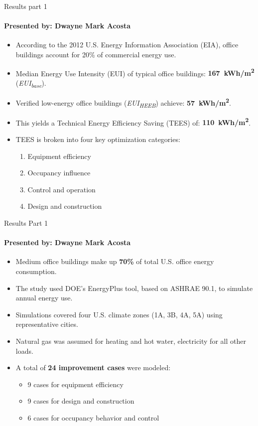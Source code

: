 \documentclass{beamer}
\begin{document}
\begin{frame}{Results part 1}
\framesubtitle{Presented by: Dwayne Mark Acosta}
\begin{itemize}
    \item According to the 2012 U.S. Energy Information Association (EIA), office buildings account for 20\% of commercial energy use.
    \item Median Energy Use Intensity (EUI) of typical office buildings: \textbf{167~kWh/m\textsuperscript{2}} (\textit{EUI\textsubscript{base}}).
    \item Verified low-energy office buildings (\textit{EUI\textsubscript{HEEB}}) achieve: \textbf{57~kWh/m\textsuperscript{2}}.
    \item This yields a Technical Energy Efficiency Saving (TEES) of: \textbf{110~kWh/m\textsuperscript{2}}.
    \item TEES is broken into four key optimization categories:
    \begin{enumerate}
        \item Equipment efficiency
        \item Occupancy influence
        \item Control and operation
        \item Design and construction
    \end{enumerate}
\end{itemize}
\end{frame}

\begin{frame}{Results Part 1}
\framesubtitle{Presented by: Dwayne Mark Acosta}

\begin{itemize}
    \item Medium office buildings make up \textbf{70\%} of total U.S. office energy consumption.
    \item The study used DOE's EnergyPlus tool, based on ASHRAE 90.1, to simulate annual energy use.
    \item Simulations covered four U.S. climate zones (1A, 3B, 4A, 5A) using representative cities.
    \item Natural gas was assumed for heating and hot water, electricity for all other loads.
    \item A total of \textbf{24 improvement cases} were modeled:
    \begin{itemize}
        \item 9 cases for equipment efficiency
        \item 9 cases for design and construction
        \item 6 cases for occupancy behavior and control
    \end{itemize}
\end{itemize}
\end{frame}
\end{document}
